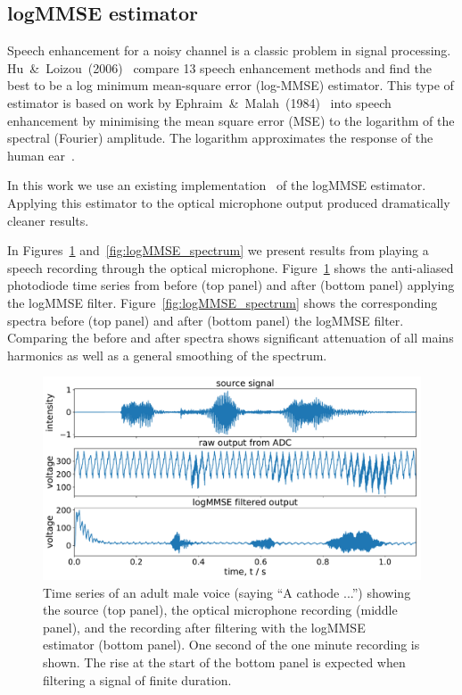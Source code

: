 \documentclass[paper-main.tex]{subfiles}
\begin{document}
\subsection{logMMSE estimator}
\label{sec:logmmse}

Speech enhancement for a noisy channel is a classic problem in signal processing. 
Hu~\&~Loizou~(2006)~\cite{SubjectiveComparison} compare 13 speech enhancement methods and find the best to be a log minimum mean-square error (log-MMSE) estimator. 
This type of estimator is based on work by Ephraim~\&~Malah~(1984)~\cite{Ephraim1984SpeechEU_logMMSE} into speech enhancement by minimising the mean square error (MSE) to the logarithm of the spectral (Fourier) amplitude.
The logarithm approximates the response of the human ear~\cite{SubjectiveComparison}.


In this work we use an existing implementation~\cite{logmmse} of the logMMSE estimator. 
Applying this estimator to the optical microphone output produced dramatically cleaner results. 

In Figures~\ref{fig:logMMSE_timeseries} and~\ref{fig:logMMSE_spectrum} we present results from playing a speech recording through the optical microphone. 
Figure~\ref{fig:logMMSE_timeseries} shows the anti-aliased photodiode time series from before (top panel) and after (bottom panel) applying the logMMSE filter. 
Figure~\ref{fig:logMMSE_spectrum} shows the corresponding spectra before (top panel) and after (bottom panel) the logMMSE filter. 
Comparing the before and after spectra shows significant attenuation of all mains harmonics as well as a general smoothing of the spectrum. 

\begin{figure}
	\includegraphics[width=\textwidth]{figures/combined_timeseries_melatos.pdf}
	\caption{Time series of an adult male voice (saying ``A cathode ...'') showing the source (top panel), the optical microphone recording (middle panel), and the recording after filtering with the logMMSE estimator (bottom panel). One second of the one minute recording is shown. The rise at the start of the bottom panel is expected when filtering a signal of finite duration.}
	\label{fig:logMMSE_timeseries}
\end{figure}
\end{document}
